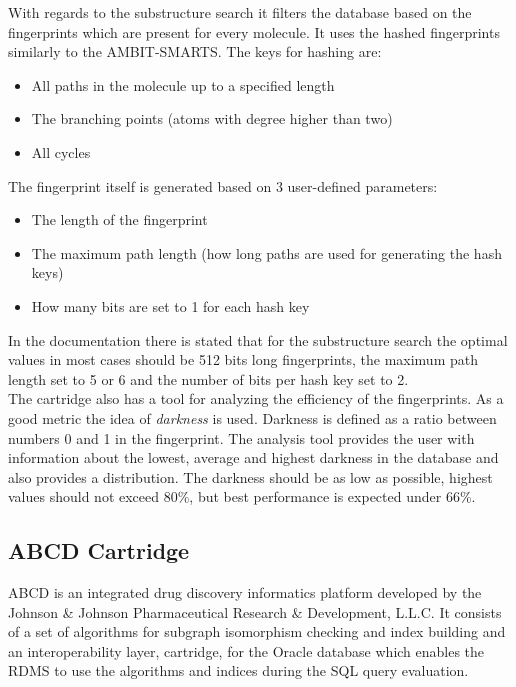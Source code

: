 With regards to the substructure search it filters the database based on the fingerprints which are present for every molecule. It uses the hashed fingerprints similarly to the AMBIT-SMARTS. The keys for hashing are:

\begin{itemize}
	\item All paths in the molecule up to a specified length
	\item The branching points (atoms with degree higher than two)
	\item All cycles
\end{itemize}

\noindent The fingerprint itself is generated based on 3 user-defined parameters:

\begin{itemize}
	\item The length of the fingerprint
	\item The maximum path length (how long paths are used for generating the hash keys)
	\item How many bits are set to 1 for each hash key
\end{itemize}

In the documentation there is stated that for the substructure search the optimal values in most cases should be 512 bits long fingerprints, the maximum path length set to 5 or 6 and the number of bits per hash key set to 2.\\

The cartridge also has a tool for analyzing the efficiency of the fingerprints. As a good metric the idea of \textit{darkness} is used. Darkness is defined as a ratio between numbers 0 and 1 in the fingerprint. The analysis tool provides the user with information about the lowest, average and highest darkness in the database and also provides a distribution. The darkness should be as low as possible, highest values should not exceed 80\%, but best performance is expected under 66\%.

\subsection{ABCD Cartridge}

ABCD is an integrated drug discovery informatics platform developed by the Johnson \& Johnson Pharmaceutical Research \& Development, L.L.C. It consists of a set of algorithms for subgraph isomorphism checking and index building and an interoperability layer, cartridge, for the Oracle database which enables the RDMS to use the algorithms and indices during the SQL query evaluation.\\

